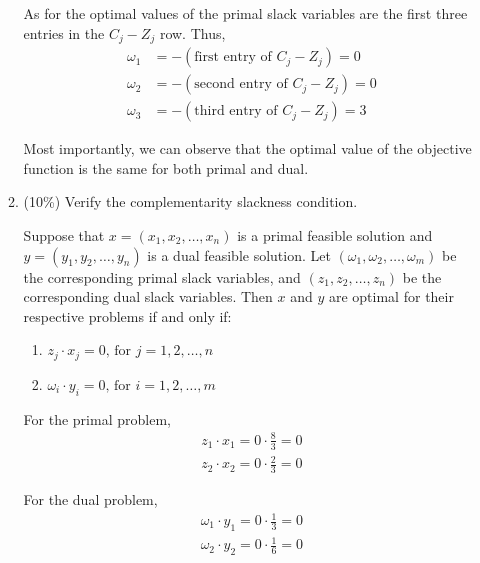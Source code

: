 \documentclass[a4paper,10pt]{article}
\begin{document}
\begin{enumerate}
\begin{enumerate}
{            As for the optimal values of the primal slack variables are the first three entries in the $C_j - Z_j$ row. Thus,
            \begin{align}
                \omega_1 &= -(\text{first entry of }C_j - Z_j) = 0 \\
                \omega_2 &= -(\text{second entry of }C_j - Z_j) = 0 \\ 
                \omega_3 &= -(\text{third entry of }C_j - Z_j) = 3  
            \end{align}
            
            Most importantly, we can observe that the optimal value of the objective function is the same for both primal and dual.
        }

        \item (10\%) Verify the complementarity slackness condition.
        {\color{blue}
            Suppose that $x = (x_1, x_2, \ldots, x_n)$ is a {\color{red}primal feasible} solution and $y = (y_1, y_2, \ldots, y_n)$ is a {\color{red}dual feasible} solution. 
            Let $(\omega_1, \omega_2, \ldots, \omega_m)$ be the corresponding primal slack variables, and $(z_1, z_2, \ldots, z_n)$ be the corresponding dual slack variables.
            Then {\color{red} $x$ and $y$ are optimal} for their respective problems if and only if:
            \begin{enumerate}
                \item $z_j \cdot x_j = 0 \text{, for } j = 1, 2, \ldots, n$
                \item $\omega_i \cdot y_i = 0 \text{, for } i = 1, 2, \ldots, m$
            \end{enumerate} 

            For the primal problem, 
            \begin{align}
                z_1 \cdot x_1 = 0 \cdot \frac{8}{3} = 0 \\
                z_2 \cdot x_2 = 0 \cdot \frac{2}{3} = 0
            \end{align}

            For the dual problem, 
            \begin{align}
                \omega_1 \cdot y_1 = 0 \cdot \frac{1}{3} = 0 \\
                \omega_2 \cdot y_2 = 0 \cdot \frac{1}{6} = 0
            \end{align}
        }


\end{enumerate}
\end{enumerate}
\end{document}
